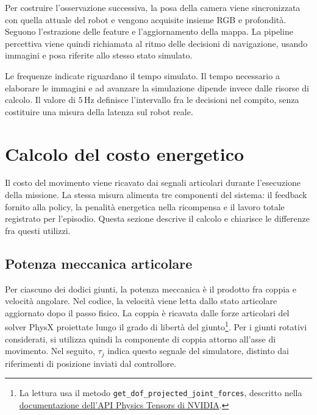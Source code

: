 Per costruire l'osservazione successiva, la posa della camera viene sincronizzata con quella attuale del robot e vengono acquisite insieme RGB e profondità. Seguono l'estrazione delle feature e l'aggiornamento della mappa. La pipeline percettiva viene quindi richiamata al ritmo delle decisioni di navigazione, usando immagini e posa riferite allo stesso stato simulato.

Le frequenze indicate riguardano il tempo simulato. Il tempo necessario a elaborare le immagini e ad avanzare la simulazione dipende invece dalle risorse di calcolo. Il valore di $5\,\mathrm{Hz}$ definisce l'intervallo fra le decisioni nel compito, senza costituire una misura della latenza sul robot reale.

\section{Calcolo del costo energetico}
\label{sec:metodo-energia}

Il costo del movimento viene ricavato dai segnali articolari durante l'esecuzione della missione. La stessa misura alimenta tre componenti del sistema: il feedback fornito alla policy, la penalità energetica nella ricompensa e il lavoro totale registrato per l'episodio. Questa sezione descrive il calcolo e chiarisce le differenze fra questi utilizzi.

\subsection{Potenza meccanica articolare}

Per ciascuno dei dodici giunti, la potenza meccanica è il prodotto fra coppia e velocità angolare. Nel codice, la velocità viene letta dallo stato articolare aggiornato dopo il passo fisico. La coppia è ricavata dalle forze articolari del solver PhysX proiettate lungo il grado di libertà del giunto\footnote{La lettura usa il metodo \texttt{get\_dof\_projected\_joint\_forces}, descritto nella \href{https://docs.omniverse.nvidia.com/kit/docs/omni_physics/107.3/extensions/runtime/source/omni.physics.tensors/docs/api/python.html\#omni.physics.tensors.impl.api.ArticulationView.get_dof_projected_joint_forces}{documentazione dell'API Physics Tensors di NVIDIA}.}. Per i giunti rotativi considerati, si utilizza quindi la componente di coppia attorno all'asse di movimento. Nel seguito, $\tau_j$ indica questo segnale del simulatore, distinto dai riferimenti di posizione inviati dal controllore.

